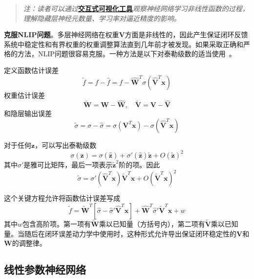 \documentclass[12pt,a4paper]{ctexart}
\begin{document}
\begin{quote}
\textit{注：读者可以通过}\href{https://frankjie09.github.io/Robot-Manipulator-Control-CN/figures/Neural_Network_Control.html}{\textbf{交互式可视化工具}}\textit{观察神经网络学习非线性函数的过程，理解隐藏层神经元数量、学习率对逼近精度的影响。}
\end{quote}

\textbf{克服NLIP问题}。多层神经网络在权重$\bm{V}$方面是非线性的，因此产生保证闭环反馈系统中稳定性和有界权重的权重调整算法直到几年前才被发现。如果采取正确和严格的方法，NLIP问题很容易克服。一种方法是以下对泰勒级数的适当使用~\cite{lewis1996}。

定义函数估计误差
\begin{equation}\label{eq:8.2.8}
\tilde{f} = f - \hat{f} = f - \hat{\bm{W}}^T \sigma(\hat{\bm{V}}^T \bm{x})
\end{equation}
权重估计误差
\begin{equation}\label{eq:8.2.9}
\tilde{\bm{W}} = \bm{W} - \hat{\bm{W}}, \quad \tilde{\bm{V}} = \bm{V} - \hat{\bm{V}}
\end{equation}
和隐层输出误差
\begin{equation}\label{eq:8.2.10}
\tilde{\sigma} = \sigma - \hat{\sigma} = \sigma(\bm{V}^T \bm{x}) - \sigma(\hat{\bm{V}}^T \bm{x})
\end{equation}

对于任何$\bm{z}$，可以写出泰勒级数
\begin{equation}\label{eq:8.2.11}
\sigma(\bm{z}) = \sigma(\hat{\bm{z}}) + \sigma'(\hat{\bm{z}})\tilde{\bm{z}} + O(\tilde{\bm{z}})^2
\end{equation}
其中$\sigma'$是雅可比矩阵，最后一项表示$\tilde{\bm{z}}^2$阶的项。因此
\begin{equation}\label{eq:8.2.12}
\tilde{\sigma} = \sigma'(\hat{\bm{V}}^T \bm{x})\tilde{\bm{V}}^T \bm{x} + O(\tilde{\bm{V}}^T \bm{x})^2
\end{equation}

这个关键方程允许将函数估计误差写成
\begin{equation}\label{eq:8.2.13}
\tilde{f} = \tilde{\bm{W}}^T \left[\hat{\sigma} - \hat{\sigma}'\hat{\bm{V}}^T \bm{x}\right] + \hat{\bm{W}}^T \hat{\sigma}' \tilde{\bm{V}}^T \bm{x} + w
\end{equation}
其中$w$包含高阶项。第一项有$\tilde{\bm{W}}$乘以已知量（方括号内），第二项有$\tilde{\bm{V}}$乘以已知量。当随后在闭环误差动力学中使用时，这种形式允许导出保证闭环稳定性的$\bm{V}$和$\bm{W}$的调整律。

\subsection{线性参数神经网络}
\end{document}
